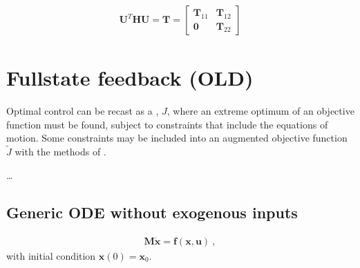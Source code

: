 \documentclass[letterpaper,10pt,english]{jupyterBook}
\begin{document}
\sphinxAtStartPar
{}

\sphinxAtStartPar
{}
\begin{equation*}
\begin{split}\mathbf{U}^T \mathbf{H} \mathbf{U} = \mathbf{T} = \begin{bmatrix} \mathbf{T}_{11} & \mathbf{T}_{12} \\ \mathbf{0} & \mathbf{T}_{22} \end{bmatrix}\end{split}
\end{equation*}
\sphinxstepscope


\section{Full\sphinxhyphen{}state feedback (OLD)}
\label{\detokenize{ch/control/optimal-control-full-state-old:full-state-feedback-old}}\label{\detokenize{ch/control/optimal-control-full-state-old:control-optimal-full-state-fb-old}}\label{\detokenize{ch/control/optimal-control-full-state-old::doc}}
\sphinxAtStartPar
Optimal control can be recast as a , \(J\), where an extreme \sphinxhyphen{} optimum \sphinxhyphen{} of an objective function must be found, subject to constraints that include the equations of motion. Some constraints may be included into an augmented objective function \(\widetilde{J}\) with the methods of {\hyperref[\detokenize{ch/optimization/intro:optimization-constrained-lagrange-multipliers}]{}}.

\sphinxAtStartPar
{}

\sphinxAtStartPar
…


\subsection{Generic ODE without exogenous inputs}
\label{\detokenize{ch/control/optimal-control-full-state-old:generic-ode-without-exogenous-inputs}}\label{\detokenize{ch/control/optimal-control-full-state-old:control-optimal-full-state-fb-ode}}\begin{equation*}
\begin{split}\mathbf{M} \dot{\mathbf{x}} = \mathbf{f}(\mathbf{x}, \mathbf{u}) \ ,\end{split}
\end{equation*}
\sphinxAtStartPar
with initial condition \(\mathbf{x}(0) = \mathbf{x}_0\).
\end{document}
